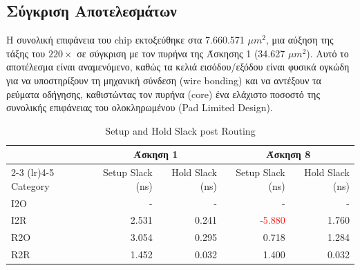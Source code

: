 \subsection{Σύγκριση Αποτελεσμάτων}

Η συνολική επιφάνεια του chip εκτοξεύθηκε στα 7.660.571 $\mu m^2$, μια αύξηση της τάξης του $220\times$ σε σύγκριση με τον πυρήνα της Άσκησης 1 (34.627 $\mu m^2$). Αυτό το αποτέλεσμα είναι αναμενόμενο, καθώς τα κελιά εισόδου/εξόδου είναι φυσικά ογκώδη για να υποστηρίξουν τη μηχανική σύνδεση (wire bonding) και να αντέξουν τα ρεύματα οδήγησης, καθιστώντας τον πυρήνα (core) ένα ελάχιστο ποσοστό της συνολικής επιφάνειας του ολοκληρωμένου (Pad Limited Design).
\begin{table}[H]
    \centering
    \caption{Setup and Hold Slack post Routing}
    \label{tab:t8_slack}
    \begin{tabular}{lrrrr}
        \toprule
         & \multicolumn{2}{c}{\textbf{Άσκηση 1}} & \multicolumn{2}{c}{\textbf{Άσκηση 8}} \\
        \cmidrule(lr){2-3} \cmidrule(lr){4-5}
        Category & Setup Slack (ns) & Hold Slack (ns) & Setup Slack (ns) & Hold Slack (ns) \\
        \midrule
        I2O & - & - & - & - \\
        I2R & 2.531 & 0.241 & \textcolor{red}{-5.880} & 1.760 \\
        R2O & 3.054 & 0.295 & 0.718 & 1.284 \\
        R2R & 1.452 & 0.032 & 1.400 & 0.032 \\
        \bottomrule
    \end{tabular}
\end{table}

